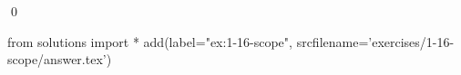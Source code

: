 
\begin{ex}
  \label{ex:1-16-scope}
  
  \qed
\end{ex}
\begin{python0}
from solutions import *
add(label="ex:1-16-scope",
    srcfilename='exercises/1-16-scope/answer.tex')
\end{python0}
